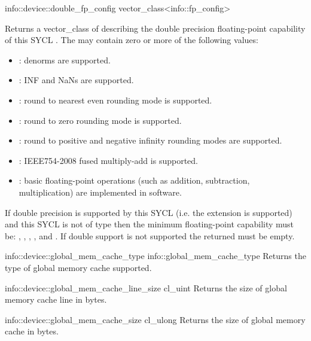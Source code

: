   \addInfoRow
  {info::device::double_fp_config}
  {vector_class<info::fp_config>}
  {
  Returns a vector_class of  describing the double precision floating-point capability of this SYCL . The  may contain zero or more of the following values:
  \begin{itemize}
    \item {}: denorms are
    supported.
    \item {}: INF and NaNs are
    supported.
    \item {}: round to
    nearest even rounding mode is supported.
    \item {}: round to
    zero rounding mode is supported.
    \item {}: round to
    positive and negative infinity rounding modes are supported.
    \item {}: IEEE754-2008 fused
    multiply-add is supported.
    \item {}: basic
    floating-point operations (such as addition, subtraction, multiplication) are implemented in software.
  \end{itemize}
  If double precision is supported by this SYCL  (i.e. the  extension is supported) and this SYCL  is not of type  then the minimum floating-point capability must be:
  , , , ,  and . If double support is not supported the returned  must be empty.
  }

  \addInfoRow
  {info::device::global_mem_cache_type}
  {info::global_mem_cache\-_type}
  { 
    Returns the type of global memory cache supported.
  }

  \addInfoRow
  {info::device::global_mem_cache_line_size}
  {cl_uint}
  {
    Returns the size of global memory cache line in bytes.
  }

  \addInfoRow
  {info::device::global_mem_cache_size}
  {cl_ulong}
  {Returns the size of global memory cache in bytes.}

